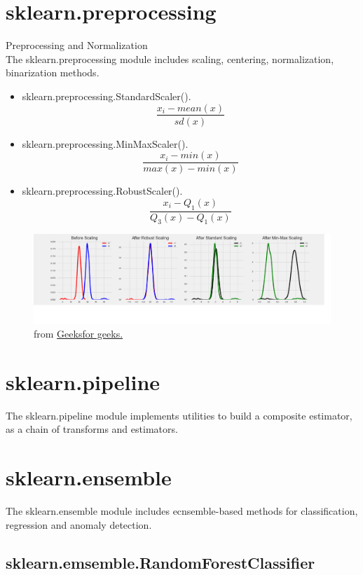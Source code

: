 \documentclass[12pt, a4paper]{book}
\begin{document}
\chapter{sklearn.preprocessing}
Preprocessing and Normalization\\
The sklearn.preprocessing module includes scaling, centering, normalization, binarization methods.
\begin{itemize}
	\item sklearn.preprocessing.StandardScaler().
	\begin{equation}
		\frac{x_i-mean(x)}{sd(x)}
	\end{equation}
	\item sklearn.preprocessing.MinMaxScaler().
	\begin{equation}
		\frac{x_i-min(x)}{max(x)-min(x)}
	\end{equation}
	\item sklearn.preprocessing.RobustScaler().
	\begin{equation}
		\frac{x_i-Q_1(x)}{Q_3(x)-Q_1(x)}
	\end{equation}
\end{itemize}

\begin{figure}[H]
	\centering
	\includegraphics[scale=0.5]{scaler.png}
	\caption{from \href{https://www.geeksforgeeks.org/standardscaler-minmaxscaler-and-robustscaler-techniques-ml/}{Geeksfor geeks.}}
\end{figure}
\chapter{sklearn.pipeline}
The sklearn.pipeline module implements utilities to build a composite estimator, as a chain of transforms and estimators.

\chapter{sklearn.ensemble}
The sklearn.ensemble module includes ecnsemble-based methods for classification, regression and anomaly detection.
\section{sklearn.emsemble.RandomForestClassifier}
\end{document}
